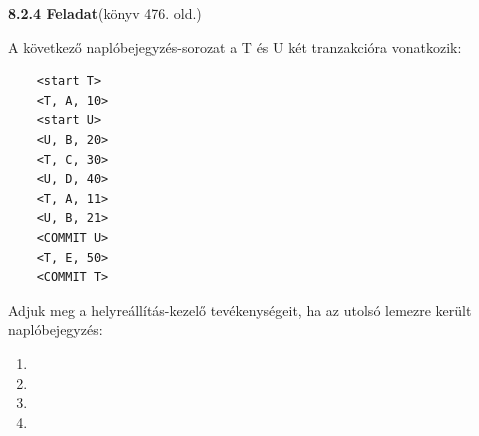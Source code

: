 \documentclass[a4paper,11.5pt, table]{article}
\begin{document}
	{\large \textbf{8.2.4 Feladat}}(könyv 476. old.)
	
	A következő naplóbejegyzés-sorozat a T és U két tranzakcióra vonatkozik:
	\begin{lstlisting}
	<start T> 
	<T, A, 10> 
	<start U> 
	<U, B, 20> 
	<T, C, 30> 
	<U, D, 40>
	<T, A, 11>
	<U, B, 21>  
	<COMMIT U>
	<T, E, 50> 
	<COMMIT T>
	\end{lstlisting}
	Adjuk meg a helyreállítás-kezelő tevékenységeit, ha az utolsó lemezre került naplóbejegyzés:
	\begin{enumerate}[label=\alph*)]
		\item <start U> 
		\item <COMMIT U>
		\item <T, E, 50>
		\item <COMMIT T>
	\end{enumerate}
	
\end{document}
